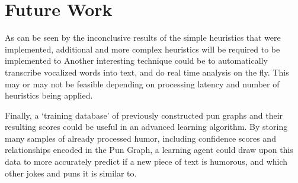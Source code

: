 \section{Future Work}
As can be seen by the inconclusive results of the simple heuristics that were implemented, additional and more complex heuristics will be required to be implemented to 
Another interesting technique could be to automatically transcribe vocalized words into text, and do real time analysis on the fly. This may or may not be feasible depending on processing latency and number of heuristics being applied.

Finally, a `training database' of previously constructed pun graphs and their resulting scores could be useful in an advanced learning algorithm. By storing many samples of already processed humor, including confidence scores and relationships encoded in the Pun Graph, a learning agent could draw upon this data to more accurately predict if a new piece of text is humorous, and which other jokes and puns it is similar to.
